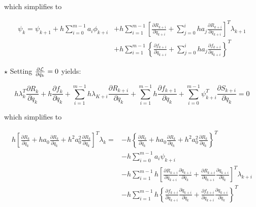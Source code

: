 \documentclass{beamer}
\newcommand{\pd}[2]{\frac{\partial #1}{\partial #2}}
\begin{document}
\begin{frame}[allowframebreaks]
{    which simplifies to

    \begin{equation}
      \begin{split}
        \psi_k = \psi_{k+1} + h \sum_{i=0}^{m-1} a_i \phi_{k+i} & + h \sum_{i=1}^{m-1}
        \left[ \pd{R_{k+i}}{\dot{q}_{k+i}} + \sum_{j=0}^{i} ha_j \pd{R_{k+i}}{{q}_{k+i}}  \right]^T \lambda_{k+1}\\
        & + h \sum_{i=1}^{m-1}
        \left\{ \pd{f_{k+i}}{\dot{q}_{k+i}} + \sum_{j=0}^{i} ha_j \pd{f_{k+i}}{{q}_{k+i}}  \right\}^T
      \end{split}
    \end{equation}

    
    $\star$ Setting $\pd{\cal{L}}{\ddot{q}_k} = 0$ yields:

    $$ h \lambda_k^T \pd{R_k}{\ddot{q}_k} + h \pd{f_k}{\ddot{q}_k} +
    \sum_{i=1}^{m-1} h \lambda_{K+i} \pd{R_{k+i}}{\ddot{q}_k} + \sum_{i=1}^{m-1} h
    \pd{f_{k+1}}{\ddot{q}_k} + \sum_{i=0}^{m-1} \psi_{k+i}^T
    \pd{S_{k+i}}{\ddot{q}_k} =0
    $$
    
    which simplifies to
    
    \begin{equation}
      \begin{split}
        h \left[ \pd{R_k}{\ddot{q}_k} + h a_0 \pd{R_k}{\dot{q}_k} +  h^2 a_0^2  \pd{R_k}{{q}_k} \right]^T \lambda_k = & -  h \left\{ \pd{R_k}{\ddot{q}_k} + h a_0 \pd{R_k}{\dot{q}_k} +  h^2 a_0^2  \pd{R_k}{{q}_k} \right\}^T\\
        & - h \sum_{i=0}^{m-1} a_i \psi_{k+i} \\
        & - h \sum_{i=1}^{m-1} h \left[ \pd{R_{k+i}}{\dot{q}_{k+i}}\pd{\dot{q}_{k+i}}{\ddot{q}_k} + \pd{R_{k+i}}{q_{k+i}}\pd{q_{k+i}}{\ddot{q}_k} \right]^T \lambda_{k+i}\\
        & - h \sum_{i=1}^{m-1} h \left\{ \pd{f_{k+i}}{\dot{q}_{k+i}}\pd{\dot{q}_{k+i}}{\ddot{q}_k} + \pd{f_{k+i}}{q_{k+i}}\pd{q_{k+i}}{\ddot{q}_k} \right\}^T
      \end{split}
    \end{equation}

    \framebreak
    
}
\end{frame}
\end{document}
